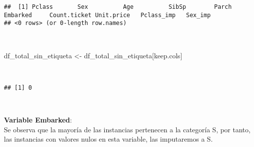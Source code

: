 \documentclass[
]{article}
\newenvironment{Shaded}{\begin{snugshade}}{\end{snugshade}}
\newcommand{\CommentTok}[1]{\textcolor[rgb]{0.56,0.35,0.01}{\textit{#1}}}
\newcommand{\KeywordTok}[1]{\textcolor[rgb]{0.13,0.29,0.53}{\textbf{#1}}}
\newcommand{\NormalTok}[1]{#1}
\newcommand{\OperatorTok}[1]{\textcolor[rgb]{0.81,0.36,0.00}{\textbf{#1}}}
\newcommand{\StringTok}[1]{\textcolor[rgb]{0.31,0.60,0.02}{#1}}
\begin{document}
\begin{verbatim}
##  [1] Pclass       Sex          Age          SibSp        Parch        Embarked     Count.ticket Unit.price   Pclass_imp   Sex_imp     
## <0 rows> (or 0-length row.names)
\end{verbatim}

\texttt{}\\
\texttt{}

\begin{Shaded}
\begin{Highlighting}[]
\NormalTok{df_total_sin_etiqueta <-}\StringTok{ }\NormalTok{df_total_sin_etiqueta[keep.cols]}
\end{Highlighting}
\end{Shaded}

\texttt{}~\\
\texttt{}

\begin{Shaded}
\end{Shaded}

\begin{verbatim}
## [1] 0
\end{verbatim}

\texttt{}~\\
\texttt{}

\textbf{Variable Embarked}: \texttt{}\\
Se observa que la mayoría de las instancias pertenecen a la categoría S,
por tanto, las instancias con valores nulos en esta variable, las
imputaremos a S.

\texttt{}

\begin{Shaded}
\end{Shaded}
\end{document}
